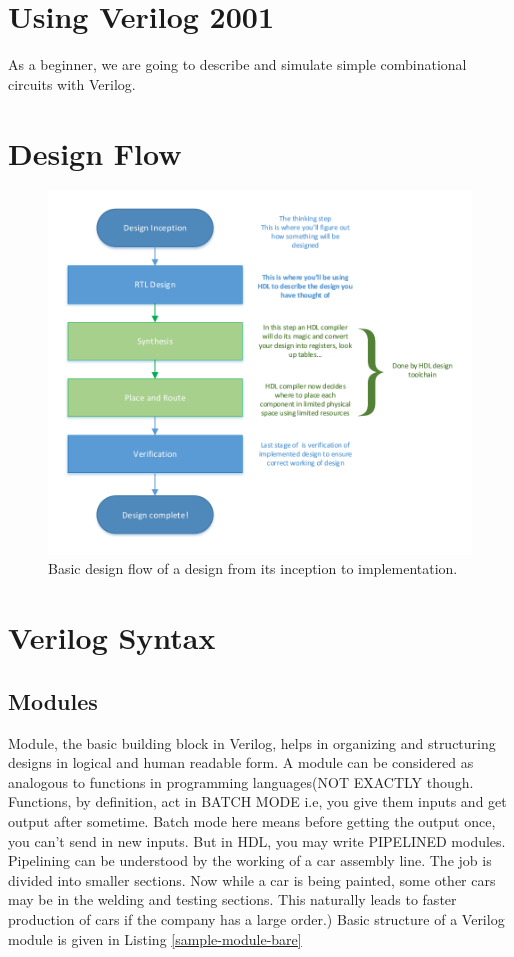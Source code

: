 \documentclass[a4paper,10pt]{article}
\theoremstyle{mytheor}
\begin{document}
\section*{Using Verilog 2001}
As a beginner, we are going to describe and simulate simple combinational circuits with Verilog.

\section*{Design Flow}  

\begin{figure}[h] \centering 
  \includegraphics[width=\linewidth]{./resources/hdl_design_flow.pdf}
  \caption{Basic design flow of a design from its inception to implementation.}
  \label{Fig:bst_sample_names}
\end{figure} 

\section*{Verilog Syntax}
\subsection*{Modules}
Module, the basic building block in Verilog, helps in organizing and structuring designs in logical and human readable form. A module can be considered as analogous to functions in programming languages(NOT EXACTLY though. Functions, by definition, act in BATCH MODE i.e, you give them inputs and get output after sometime. Batch mode here means before getting the output once, you can't send in new inputs. But in HDL, you may write PIPELINED modules. Pipelining can be understood by the working of a car assembly line. The job is divided into smaller sections. Now while a car is being painted, some other cars may be in the welding and testing sections. This naturally leads to faster production of cars if the company has a large order.) Basic structure of a Verilog module is given in Listing \ref{sample-module-bare} 
\end{document}
